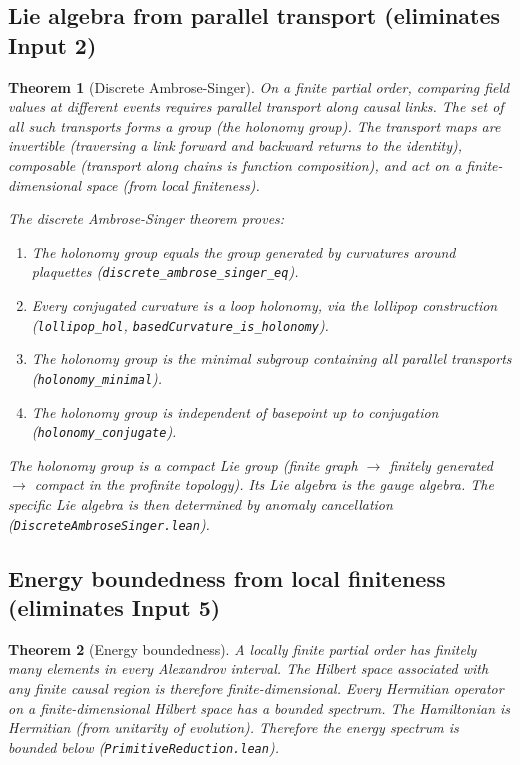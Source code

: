\documentclass[11pt,letterpaper]{article}
\newtheorem{theorem}{Theorem}
\begin{document}
\subsection{Lie algebra from parallel transport (eliminates Input 2)}

\begin{theorem}[Discrete Ambrose-Singer]
\label{thm:ambrose_singer}
On a finite partial order, comparing field values at different events
requires parallel transport along causal links.  The set of all such
transports forms a group (the holonomy group).  The transport maps are
invertible (traversing a link forward and backward returns to the
identity), composable (transport along chains is function
composition), and act on a finite-dimensional space (from local
finiteness).

The discrete Ambrose-Singer theorem proves:
\begin{enumerate}[nosep]
  \item The holonomy group equals the group generated by curvatures
    around plaquettes
    (\texttt{discrete\_ambrose\_\allowbreak singer\_eq}).
  \item Every conjugated curvature is a loop holonomy, via the
    lollipop construction (\texttt{lollipop\_hol},
    \texttt{basedCurvature\_is\_holonomy}).
  \item The holonomy group is the minimal subgroup containing all
    parallel transports (\texttt{holonomy\_minimal}).
  \item The holonomy group is independent of basepoint up to
    conjugation (\texttt{holonomy\_conjugate}).
\end{enumerate}
The holonomy group is a compact Lie group (finite graph $\to$ finitely
generated $\to$ compact in the profinite topology).  Its Lie algebra
is the gauge algebra.  The specific Lie algebra is then determined by
anomaly cancellation (\texttt{DiscreteAmbroseSinger.lean}).
\end{theorem}

\subsection{Energy boundedness from local finiteness
  (eliminates Input 5)}

\begin{theorem}[Energy boundedness]
\label{thm:energy}
A locally finite partial order has finitely many elements in every
Alexandrov interval.  The Hilbert space associated with any finite
causal region is therefore finite-dimensional.  Every Hermitian
operator on a finite-dimensional Hilbert space has a bounded spectrum.
The Hamiltonian is Hermitian (from unitarity of evolution).  Therefore
the energy spectrum is bounded below
(\texttt{PrimitiveReduction.lean}).
\end{theorem}
\end{document}
